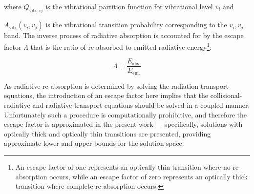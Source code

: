 \noindent where $ Q_{\text{vib.},v_i}$ is the vibrational partition function for vibrational level $v_i$ and {$A_\text{vib.}(v_i,v_j)$ is the vibrational transition probability corresponding to the $v_i,v_j$ band.
The inverse process of radiative absorption is accounted for by the escape factor $\Lambda$ that is the ratio of re-absorbed to emitted radiative energy\footnote{An escape factor of one represents an optically thin transition where no re-absorption occurs, while an escape factor of zero represents an optically thick transition where complete re-absorption occurs.}:

\begin{equation}
 \Lambda = \frac{E_\text{abs.}}{E_\text{em.}}
\end{equation}

As radiative re-absorption is determined by solving the radiation transport equations, the introduction of an escape factor here implies that the collisional-radiative and radiative transport equations should be solved in a coupled manner.
Unfortunately such a procedure is computationally prohibitive, and therefore the escape factor is approximated in the present work --- specifically, solutions with optically thick and optically thin transitions are presented, providing approximate lower and upper bounds for the solution space.







}
